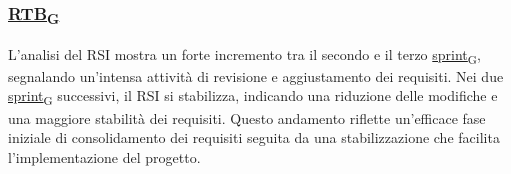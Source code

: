 \subsubsection*{\href{https://7last.github.io/docs/rtb/documentazione-interna/glossario\#requirements-and-technology-baseline}{RTB\textsubscript{G}}}
L'analisi del RSI mostra un forte incremento tra il secondo e il terzo \href{https://7last.github.io/docs/rtb/documentazione-interna/glossario\#sprint}{sprint\textsubscript{G}}, segnalando un'intensa attività di revisione e aggiustamento dei requisiti. Nei due \href{https://7last.github.io/docs/rtb/documentazione-interna/glossario\#sprint}{sprint\textsubscript{G}} successivi, il RSI si stabilizza, indicando una riduzione delle modifiche e una maggiore stabilità dei requisiti. Questo andamento riflette un'efficace fase iniziale di consolidamento dei requisiti seguita da una stabilizzazione che facilita l'implementazione del progetto.
